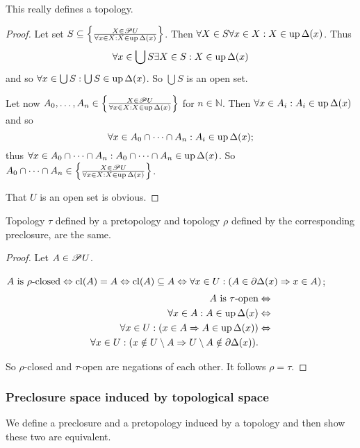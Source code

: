 \begin{prop}
This really defines a topology.\end{prop}
\begin{proof}
Let set $S\subseteq\left\{ \frac{X\in\mathscr{P} U}{\forall x\in X:X\in\operatorname{up}\Delta(x)}\right\}$.
Then $\forall X\in S\forall x\in X:X\in\operatorname{up}\Delta(x)$. Thus
\[
\forall x\in\bigcup S\exists X\in S:X\in\operatorname{up}\Delta(x)
\]
and so $\forall x\in\bigcup S:\bigcup S\in\operatorname{up}\Delta(x)$. So $\bigcup S$
is an open set.

Let now $A_{0},\dots,A_{n}\in\left\{ \frac{X\in\mathscr{P} U}{\forall x\in X:X\in\operatorname{up}\Delta(x)}\right\}$
for $n\in\mathbb{N}$. Then $\forall x\in A_{i}:A_{i}\in\operatorname{up}\Delta(x)$
and so
\[
\forall x\in A_{0}\cap\dots\cap A_{n}:A_{i}\in\operatorname{up}\Delta(x);
\]
thus $\forall x\in A_{0}\cap\dots\cap A_{n}:A_{0}\cap\dots\cap A_{n}\in\operatorname{up}\Delta(x)$.
So $A_{0}\cap\dots\cap A_{n}\in\left\{ \frac{X\in\mathscr{P} U}{\forall x\in X:X\in\operatorname{up}\Delta(x)}\right\}$.

That $U$ is an open set is obvious.\end{proof}
\begin{prop}
Topology $\tau$ defined by a pretopology and topology $\rho$ defined
by the corresponding preclosure, are the same.\end{prop}
\begin{proof}
Let $A\in\mathscr{P} U$.

$A\text{ is \ensuremath{\rho}-closed}\Leftrightarrow\operatorname{cl}(A)=A\Leftrightarrow\operatorname{cl}(A)\subseteq A\Leftrightarrow\forall x\in U:(A\in\partial\Delta(x)\Rightarrow x\in A)$;
\begin{align*}
A\text{ is \ensuremath{\tau}-open} & \Leftrightarrow\\
\forall x\in A:A\in\operatorname{up}\Delta(x) & \Leftrightarrow\\
\forall x\in U:(x\in A\Rightarrow A\in\operatorname{up}\Delta(x)) & \Leftrightarrow\\
\forall x\in U:(x\notin U\setminus A\Rightarrow U\setminus A\notin\partial\Delta(x)).
\end{align*}


So $\rho$-closed and $\tau$-open are negations of each other. It
follows $\rho=\tau$.
\end{proof}

\subsubsection{Preclosure space induced by topological space}

We define a preclosure
and a pretopology induced by a topology and then show these two are
equivalent.

